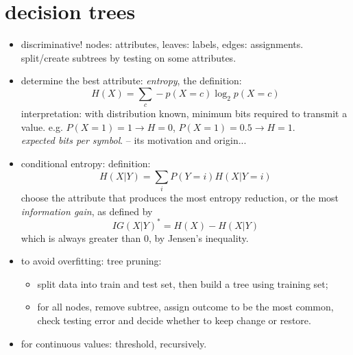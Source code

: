 \documentclass{article}
\begin{document}
\section{decision trees}
\begin{itemize}
	\item discriminative! nodes: attributes, leaves: labels, edges: assignments. \\
		split/create subtrees by testing on some attributes. 
	\item determine the best attribute: {\it entropy}, the definition: 
		\begin{equation}
			H(X)=\sum_c-p(X=c)\log_2p(X=c)
		\end{equation}
		interpretation: with distribution known, minimum bits required to
		transmit a value. e.g. $P(X=1)=1\rightarrow H=0$, $P(X=1)=0.5\rightarrow H=1$. \\
		{\it expected bits per symbol}. -- its motivation and origin...		
	\item conditional entropy: definition: 
		\begin{equation}
			H(X|Y)=\sum_iP(Y=i)H(X|Y=i)
		\end{equation}
		choose the attribute that produces the most entropy reduction, 
		or the most {\it information gain}, as defined by 
		\begin{equation}
			IG(X|Y)^*=H(X)-H(X|Y)
		\end{equation}
		which is always greater than 0, by Jensen's inequality. 
	\item to avoid overfitting: tree pruning: 
		\begin{itemize}
			\item split data into train and test set, then build a tree using training set;
			\item for all nodes, remove subtree, assign outcome to be the most common, 
				check testing error and decide whether to keep change or restore. 
		\end{itemize}
	\item for continuous values: threshold, recursively. 
\end{itemize}
\end{document}
